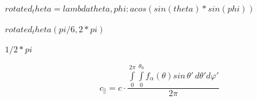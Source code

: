 \documentclass[11pt]{article}
\begin{document}
$rotated_theta = lambda theta, phi : acos(sin(theta)*sin(phi))$


$rotated_theta (pi/6, 2*pi)$


$1/2*pi$
        
    \[c_{\parallel}=c\cdot\frac{\int \limits_{0}^{2 \pi}\int\limits_{0}^{\theta_{0}}f_{\alpha}\left(\theta\right)sin\,\theta'\,d\theta'd\varphi'}{2\pi}\]
\end{document}

